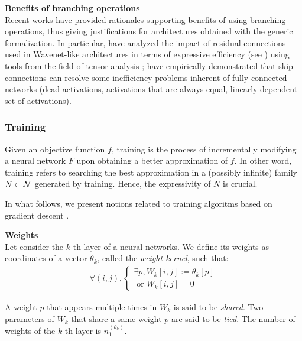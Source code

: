 \begin{remark}\textbf{Benefits of branching operations}\\
Recent works have provided rationales supporting benefits of using branching operations, thus giving justifications for architectures obtained with the generic formalization. In particular, \citep{cohen2018boosting} have analyzed the impact of residual connections used in Wavenet-like architectures \citep{van2016wavenet} in terms of expressive efficiency (see ) using tools from the field of tensor analysis ; \citep{orhan2018skip} have empirically demonstrated that skip connections can resolve some inefficiency problems inherent of fully-connected networks (dead activations, activations that are always equal, linearly dependent set of activations).
\end{remark}

\subsubsection{Training}
\label{sec:training}

Given an objective function $f$, training is the process of incrementally modifying a neural network $F$ upon obtaining a better approximation of $f$. In other word, training refers to searching the best approximation in a (possibly infinite) family $N \subset \mathcal{N}$ generated by training. Hence, the expressivity of $N$ is crucial.

In what follows, we present notions related to training algoritms based on gradient descent \citep{widrow1960adaptive}.


\begin{definition}\textbf{Weights}\\
Let consider the $k$-th layer of a neural networks. We define its weights as coordinates of a vector $\theta_k$, called the \emph{weight kernel}, such that:
\begin{gather*}
  \forall (i,j),
    \begin{cases}
      \exists p, W_k[i,j] := \theta_k[p] \\
      \text{ or } W_k[i,j] = 0
    \end{cases}
\end{gather*}
\end{definition}
A weight $p$ that appears multiple times in $W_k$ is said to be \emph{shared}. Two parameters of $W_k$ that share a same weight $p$ are said to be \emph{tied}. The number of weights of the $k$-th layer is $n_1^{(\theta_k)}$.

